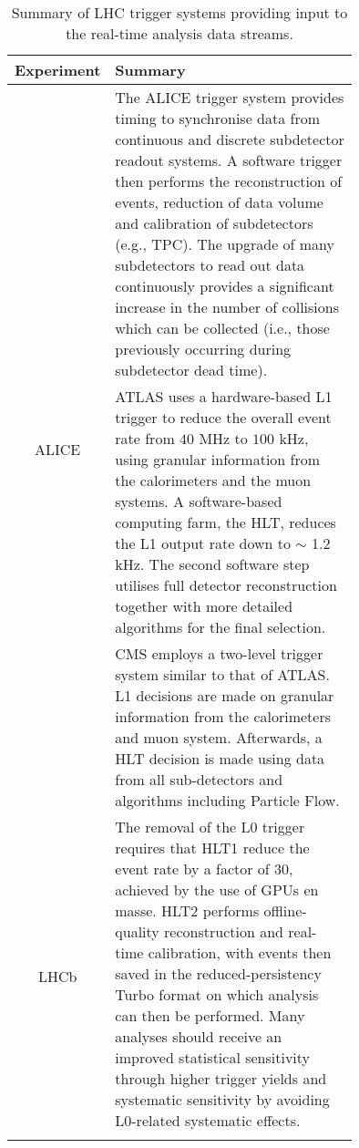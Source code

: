 \begin{table}[h!]
    \centering
    \begin{tabular}{c|p{0.75\linewidth}}
        \thickhline
        \small{\textbf{Experiment}} & \textbf{Summary} \\
        \hline\hline
        \multirow{3}{*}{\small{ALICE}}
            & \small{The ALICE trigger system provides timing to synchronise data from continuous and discrete subdetector readout systems. A software trigger then performs the reconstruction of events, reduction of data volume and calibration of subdetectors (e.g., TPC). The upgrade of many subdetectors to read out data continuously provides a significant increase in the number of collisions which can be collected (i.e., those previously occurring during subdetector dead time).} \\
        \hline
        \multirow{3}{*}{\small{ATLAS}}
            & \small{ATLAS uses a hardware-based L1 trigger to reduce the overall event rate from $40$ MHz to $100$ kHz, using granular information from the calorimeters and the muon systems. A software-based computing farm, the HLT, reduces the L1 output rate down to $\sim$ 1.2 kHz. The second software step utilises full detector reconstruction together with more detailed algorithms for the final selection.} \\ \hline
        \multirow{3}{*}{\small{CMS}}
            & CMS employs a two-level trigger system similar to that of ATLAS. L1 decisions are made on granular information from the calorimeters and muon system. Afterwards, a HLT decision is made using data from all sub-detectors and algorithms including Particle Flow.
            \\ \hline
        \multirow{3}{*}{\small{LHCb}}
            & \small{The removal of the L0 trigger requires that HLT1 reduce the event rate by a factor of 30, achieved by the use of GPUs en masse. HLT2 performs offline-quality reconstruction and real-time calibration, with events then saved in the reduced-persistency Turbo format on which analysis can then be performed. Many analyses should receive an improved statistical sensitivity through higher trigger yields and systematic sensitivity by avoiding L0-related systematic effects.} \\
        \thickhline
    \end{tabular}
    \caption{Summary of LHC trigger systems providing input to the real-time analysis data streams.}
    \label{trigger-table}
\end{table}

